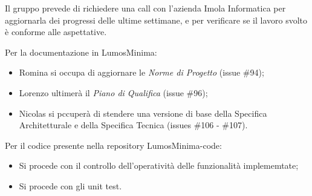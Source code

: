 \documentclass[a4paper, 12pt]{article}
\begin{document}
Il gruppo prevede di richiedere una call con l'azienda Imola Informatica per aggiornarla dei progressi delle ultime settimane, e per verificare se il lavoro svolto è conforme alle aspettative.

Per la documentazione in LumosMinima:
\begin{itemize}
    \item Romina si occupa di aggiornare le \textit{Norme di Progetto} (issue \#94);
    \item Lorenzo ultimerà il \textit{Piano di Qualifica} (issue \#96);
    \item Nicolas si pccuperà di stendere una versione di base della Specifica Architetturale e della Specifica Tecnica (issues \#106 - \#107).
\end{itemize}

Per il codice presente nella repository LumosMinima-code:
\begin{itemize}
    \item Si procede con il controllo dell'operatività delle funzionalità implememtate;
    \item Si procede con gli unit test.
\end{itemize}
\end{document}
